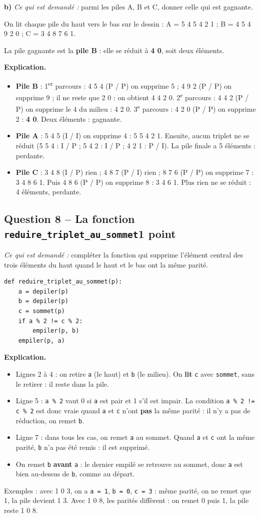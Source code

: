 \documentclass[11pt, a4paper]{exam}
\newcommand{\code}[1]{\texttt{#1}}
\newcommand{\Qt}[2]{\subsection*{#1\hfill{\normalfont\small #2}}}
\newcommand{\rappel}[1]{\noindent\textit{Ce qui est demandé :} #1\par\smallskip}
\newcommand{\explication}{\noindent\textbf{Explication.}\ }
\begin{document}
\textbf{b)} \rappel{parmi les piles A, B et C, donner celle qui est gagnante.}

On lit chaque pile du haut vers le bas sur le dessin : A = 5 4 5 4 2 1 ; B = 4 5 4 9 2 0 ; C = 3 4 8 7 6 1.
\begin{reponse}
La pile gagnante est la \textbf{pile B} : elle se réduit à \textbf{4 0}, soit deux éléments.
\end{reponse}
\explication
\begin{itemize}
\item \textbf{Pile B} :
1\textsuperscript{er} parcours : 4 5 4 (P / P) on supprime 5 ; 4 9 2 (P / P) on supprime 9 ; il ne reste que 2 0 : on obtient 4 4 2 0.
2\textsuperscript{e} parcours : 4 4 2 (P / P) on supprime le 4 du milieu : 4 2 0.
3\textsuperscript{e} parcours : 4 2 0 (P / P) on supprime 2 : \textbf{4 0}. Deux éléments : gagnante.
\item \textbf{Pile A} : 5 4 5 (I / I) on supprime 4 : 5 5 4 2 1. Ensuite, aucun triplet ne se réduit (5 5 4 : I / P ; 5 4 2 : I / P ; 4 2 1 : P / I). La pile finale a 5 éléments : perdante.
\item \textbf{Pile C} : 3 4 8 (I / P) rien ; 4 8 7 (P / I) rien ; 8 7 6 (P / P) on supprime 7 : 3 4 8 6 1. Puis 4 8 6 (P / P) on supprime 8 : 3 4 6 1. Plus rien ne se réduit : 4 éléments, perdante.
\end{itemize}

\Qt{Question 8 -- La fonction \code{reduire\_triplet\_au\_sommet}}{1 point}
\rappel{compléter la fonction qui supprime l'élément central des trois éléments du haut quand le haut et le bas ont la même parité.}
\begin{reponse}
\begin{lstlisting}
def reduire_triplet_au_sommet(p):
    a = depiler(p)
    b = depiler(p)
    c = sommet(p)
    if a % 2 != c % 2:
        empiler(p, b)
    empiler(p, a)
\end{lstlisting}
\end{reponse}
\explication
\begin{itemize}
\item Lignes 2 à 4 : on retire \code{a} (le haut) et \code{b} (le milieu). On \textbf{lit} \code{c} avec \code{sommet}, sans le retirer : il reste dans la pile.
\item Ligne 5 : \code{a \% 2} vaut 0 si \code{a} est pair et 1 s'il est impair. La condition \code{a \% 2 != c \% 2} est donc vraie quand \code{a} et \code{c} n'ont \textbf{pas} la même parité : il n'y a pas de réduction, on remet \code{b}.
\item Ligne 7 : dans tous les cas, on remet \code{a} au sommet. Quand \code{a} et \code{c} ont la même parité, \code{b} n'a pas été remis : il est supprimé.
\item On remet \code{b} \textbf{avant} \code{a} : le dernier empilé se retrouve au sommet, donc \code{a} est bien au-dessus de \code{b}, comme au départ.
\end{itemize}
Exemples : avec 1 0 3, on a \code{a = 1}, \code{b = 0}, \code{c = 3} : même parité, on ne remet que 1, la pile devient 1 3. Avec 1 0 8, les parités diffèrent : on remet 0 puis 1, la pile reste 1 0 8.
\end{document}
